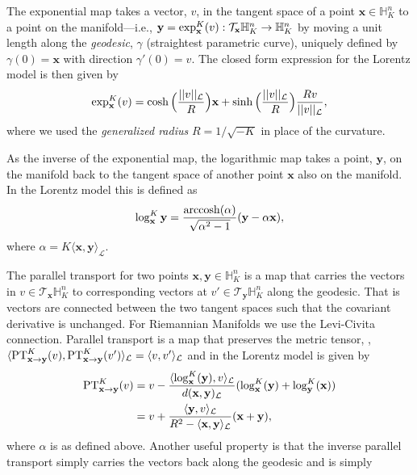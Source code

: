 The exponential map takes a vector, $v$, in the tangent space of a point $\textbf{x} \in \mathbb{H}^{n}_K$ to a point on the manifold---i.e., $\textbf{y} = \textnormal{exp}^K_\textbf{x}(v): \mathcal{T}_{\textbf{x}} \mathbb{H}^{n}_K \to \mathbb{H}^{n}_K$ by moving a unit length along the \textit{geodesic}, $\gamma$ (straightest parametric curve), uniquely defined by $\gamma(0) = \textbf{x}$ with direction $\gamma '(0)= v$. The closed form expression for the Lorentz model is then given by
\begin{equation}
    \label{eqn:exp_map}
    \textnormal{exp}^K_{\textbf{x}} (v) = \cosh \Big(\frac{||v||_{\mathcal{L}}}{R} \Big)\textbf{x} +  \sinh \Big(\frac{||v||_{\mathcal{L}}}{R} \Big)\frac{Rv}{||{v}||_{\mathcal{L}}},
\end{equation}
where we used the \textit{generalized radius} $R = 1/\sqrt{-K}$ in place of the curvature.

As the inverse of the exponential map, the logarithmic map takes a point, $\textbf{y}$, on the manifold back to the tangent space of another point $\textbf{x}$ also on the manifold. In the Lorentz model this is defined as
\begin{equation}
    \label{eqn:log_map}
    \log^K_{\textbf{x}}{\textbf{y}} = \frac{\operatorname{arccosh}(\alpha)}{\sqrt{\alpha^2 - 1}}(\textbf{y} - \alpha \textbf{x}),
\end{equation}
where $\alpha = K\langle \textbf{x}, \textbf{y} \rangle_{\mathcal{L}}$.

The parallel transport for two points $\textbf{x},\textbf{y} \in \mathbb{H}^{n}_K$ is a map that carries the vectors in $v \in \mathcal{T}_{\textbf{x}}\mathbb{H}^{n}_K$ to corresponding vectors at $v' \in \mathcal{T}_{\textbf{y}}\mathbb{H}^{n}_K$ along the geodesic. That is vectors are connected between the two tangent spaces such that the covariant derivative is unchanged. For Riemannian Manifolds we use the Levi-Civita connection. Parallel transport is a map that preserves the metric tensor, \ie, $\langle \textnormal{PT}^K_{\textbf{x} \to \textbf{y}}(v), \textnormal{PT}^K_{\textbf{x} \to \textbf{y}}(v') \rangle_{\mathcal{L}} = \langle v, v' \rangle_{\mathcal{L}}$ and in the Lorentz model is given by
\begin{align}
    \label{eqn:parallel_transport}
    \textnormal{PT}^K_{\textbf{x} \to \textbf{y}}(v) & = v - \frac{ \langle \log^K_{\textbf{x}}(\textbf{y}), v \rangle_{\mathcal{L}}}{d(\textbf{x},\textbf{y})_{\mathcal{L}}} (\log^K_{\textbf{x}}(\textbf{y})+ \log^K_{\textbf{y}}(\textbf{x})) \nonumber \\
    & = v + \frac{ \langle \textbf{y}, v \rangle_{\mathcal{L}}}{R^2 - \langle \textbf{x}, \textbf{y} \rangle_{\mathcal{L}}} (\textbf{x}+ \textbf{y}),
\end{align}
where $\alpha$ is as defined above. Another useful property is that the inverse parallel transport simply carries the vectors back along the geodesic and is simply

